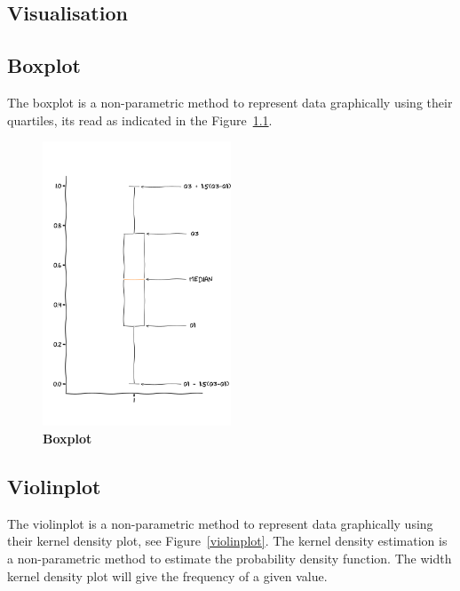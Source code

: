 \begin{appendices}


  \chapter{Visualisation}
    \section{Boxplot}
    The boxplot is a non-parametric method to represent data graphically using their quartiles, its read as indicated in the Figure~\ref{boxplot}.
      \begin{figure}[h]
        \centering
        \includegraphics[width=0.5\textwidth]{part_2/assets/boxplot.png}
        \caption{\textbf{Boxplot}}
        \label{boxplot}
      \end{figure}

    \section{Violinplot}
    The violinplot is a non-parametric method to represent data graphically using their kernel density plot, see Figure~\ref{violinplot}. The kernel density estimation is a non-parametric method to estimate the probability density function. The width kernel density plot will give the frequency of a given value.


\end{appendices}
